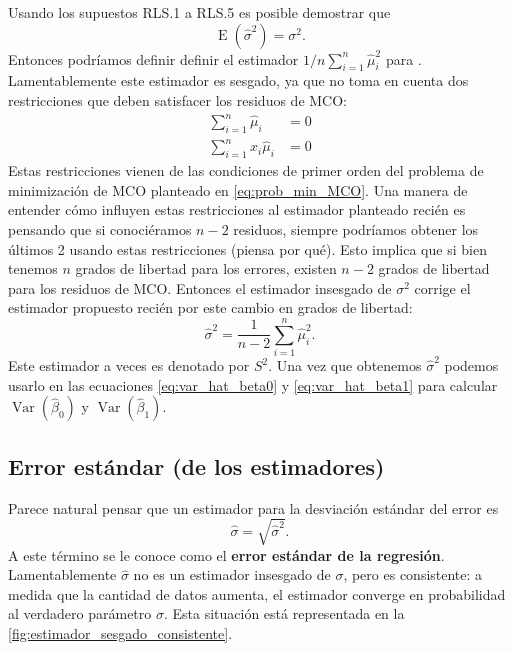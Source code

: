 \documentclass[12pt]{report}\usepackage[]{graphicx}\usepackage[]{color}
\newcommand*{\kw}[1]{\textbf{#1}\index{#1}}
\newcommand{\Var}{\operatorname{Var}}
\newcommand{\E}{\operatorname{E}}
\begin{document}
Usando los supuestos RLS.1 a RLS.5 es posible demostrar que
\begin{equation}
\E(\hat\sigma^2) = \sigma^2.
\end{equation}
Entonces podríamos definir definir el estimador $1/n \sum_{i=1}^n \hat\mu_i^2$ para . Lamentablemente este estimador es sesgado, ya que no toma en cuenta dos restricciones que deben satisfacer los residuos de MCO:
\begin{align*}
\sum_{i=1}^n \hat\mu_i &= 0 \\
\sum_{i=1}^n x_i\hat\mu_i &= 0
\end{align*}
Estas restricciones vienen de las condiciones de primer orden del problema de minimización de MCO planteado en \eqref{eq:prob_min_MCO}.
Una manera de entender cómo influyen estas restricciones al estimador planteado recién es pensando que si conociéramos $n-2$ residuos, siempre podríamos obtener los últimos 2 usando estas restricciones (piensa por qué).
Esto implica que si bien tenemos $n$ grados de libertad para los errores, existen $n-2$ grados de libertad para los residuos de MCO.
Entonces el estimador insesgado de $\sigma^2$ corrige el estimador propuesto recién por este cambio en grados de libertad:
\begin{equation}
\hat\sigma^2 = \frac{1}{n-2} \sum_{i=1}^n \hat \mu_i^2.
\end{equation}
Este estimador a veces es denotado por $S^2$.
Una vez que obtenemos $\hat\sigma^2$ podemos usarlo en las ecuaciones \eqref{eq:var_hat_beta0} y \eqref{eq:var_hat_beta1} para calcular $\Var(\hat\beta_0)$ y $\Var(\hat\beta_1)$.

\subsection{Error estándar (de los estimadores)}

Parece natural pensar que un estimador para la desviación estándar del error es
\begin{equation}
\hat\sigma = \sqrt{\hat\sigma^2}.
\end{equation}
A este término se le conoce como el \kw{error estándar de la regresión}. Lamentablemente $\hat\sigma$ no es un estimador insesgado de $\sigma$, pero es consistente: a medida que la cantidad de datos aumenta, el estimador converge en probabilidad al verdadero parámetro $\sigma$.
Esta situación está representada en la \autoref{fig:estimador_sesgado_consistente}.
\end{document}
